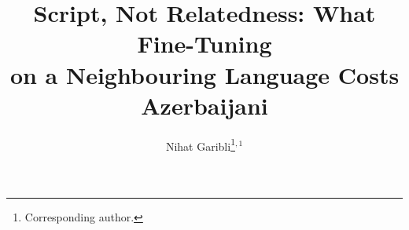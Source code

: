 \documentclass[final]{clv2025}
\begin{document}
\title{Script, Not Relatedness: What Fine-Tuning\\
on a Neighbouring Language Costs Azerbaijani}

\author{Nihat Garibli\thanks{Corresponding author.}$^{,1}$}


\maketitle
\end{document}
